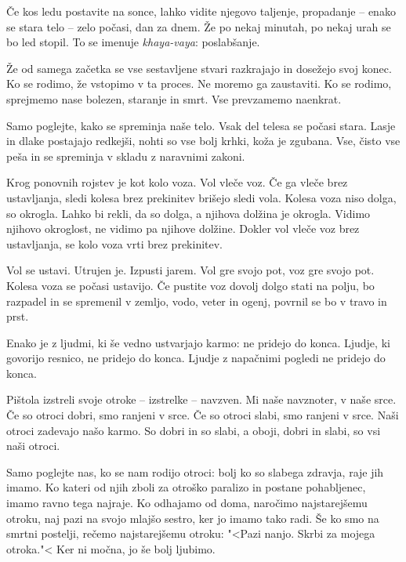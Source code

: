 \clearpage


Če kos ledu postavite na sonce, lahko vidite njegovo taljenje, propadanje – enako se stara telo – zelo počasi, dan za dnem. Že po nekaj minutah, po nekaj urah se bo led stopil. To se imenuje \emph{khaya-vaya}: poslabšanje.

Že od samega začetka se vse sestavljene stvari razkrajajo in dosežejo svoj konec. Ko se rodimo, že vstopimo v ta proces. Ne moremo ga zaustaviti. Ko se rodimo, sprejmemo nase bolezen, staranje in smrt. Vse prevzamemo naenkrat.

Samo poglejte, kako se spreminja naše telo. Vsak del telesa se počasi stara. Lasje  in dlake postajajo redkejši, nohti so vse bolj krhki, koža je zgubana. Vse, čisto vse peša in se spreminja v skladu z naravnimi zakoni.

\clearpage


Krog ponovnih rojstev je kot kolo voza. Vol vleče voz. Če ga vleče brez ustavljanja, sledi kolesa brez prekinitev brišejo sledi vola. Kolesa voza niso dolga, so okrogla. Lahko bi rekli, da so dolga, a njihova dolžina je okrogla. Vidimo njihovo okroglost, ne vidimo pa njihove dolžine. Dokler vol vleče voz brez ustavljanja, se kolo voza vrti brez prekinitev.

Vol se ustavi. Utrujen je. Izpusti jarem. Vol gre svojo pot, voz gre svojo pot. Kolesa voza se počasi ustavijo. Če pustite voz dovolj dolgo stati na polju, bo razpadel in se spremenil v zemljo, vodo, veter in ogenj, povrnil se bo v travo in prst.

Enako je z ljudmi, ki še vedno ustvarjajo karmo: ne pridejo do konca. Ljudje, ki govorijo resnico, ne pridejo do konca. Ljudje z napačnimi pogledi ne pridejo do konca.

\clearpage


Pištola izstreli svoje otroke – izstrelke – navzven. Mi naše navznoter, v naše srce. Če so otroci dobri, smo ranjeni v srce. Če so otroci slabi, smo ranjeni v srce. Naši otroci zadevajo našo karmo. So dobri in so slabi, a oboji, dobri in slabi, so vsi naši otroci.

Samo poglejte nas, ko se nam rodijo otroci: bolj ko so slabega zdravja, raje jih imamo. Ko kateri od njih zboli za otroško paralizo in postane pohabljenec, imamo ravno tega najraje. Ko odhajamo od doma, naročimo najstarejšemu otroku, naj pazi na svojo mlajšo sestro, ker jo imamo tako radi. Še ko smo na smrtni postelji, rečemo najstarejšemu otroku: "<Pazi nanjo. Skrbi za mojega otroka."< Ker ni močna, jo še bolj ljubimo.

